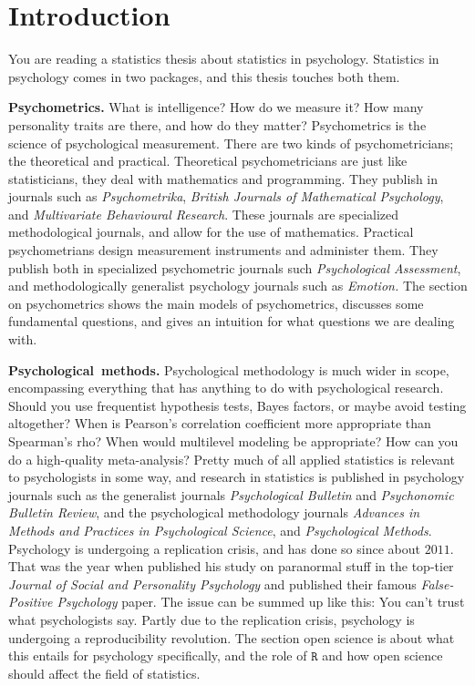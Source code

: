 \section{Introduction}

You are reading a statistics thesis about statistics in psychology. Statistics in psychology comes in two packages, and this thesis touches both them.

\textbf{Psychometrics.} What is intelligence? How do we measure it? How many personality traits are there, and how do they matter? Psychometrics is the science of psychological measurement. There are two kinds of psychometricians; the theoretical and practical. Theoretical psychometricians are just like statisticians, they deal with mathematics and programming. They publish in journals such as \textit{Psychometrika}, \textit{British Journals of Mathematical Psychology}, and \textit{Multivariate Behavioural Research}. These journals are specialized methodological journals, and allow for the use of mathematics. Practical psychometrians design measurement instruments and administer them. They publish both in specialized psychometric journals such \textit{Psychological Assessment}, and methodologically generalist psychology journals such as \textit{Emotion.} The section on psychometrics shows the main models of psychometrics, discusses some fundamental questions, and gives an intuition for what questions we are dealing with.

\textbf{Psychological~methods.} Psychological methodology is much wider in scope, encompassing everything that has anything to do with psychological research. Should you use frequentist hypothesis tests, Bayes factors, or maybe avoid testing altogether? When is Pearson's correlation coefficient more appropriate than Spearman's rho? When would multilevel modeling be appropriate? How can you do a high-quality meta-analysis? Pretty much of all applied statistics is relevant to psychologists in some way, and research in statistics is published in psychology journals such as the generalist journals \textit{Psychological Bulletin} and \textit{Psychonomic Bulletin Review}, and the psychological methodology journals \textit{Advances in Methods and Practices in Psychological Science}, and \textit{Psychological Methods}. Psychology is undergoing a replication crisis, and has done so since about $2011$. That was the year when \cite{Bem2011-vq} published his study on paranormal stuff in the top-tier \textit{Journal of Social and Personality Psychology} and \cite{simmons_false-positive_2011} published their famous \textit{False-Positive Psychology} paper. The issue can be summed up like this: You can't trust what psychologists say. Partly due to the replication crisis, psychology is undergoing a reproducibility revolution. The section open science is about what this entails for psychology specifically, and the role of $\mathtt{R}$
and how open science should affect the field of statistics. 

